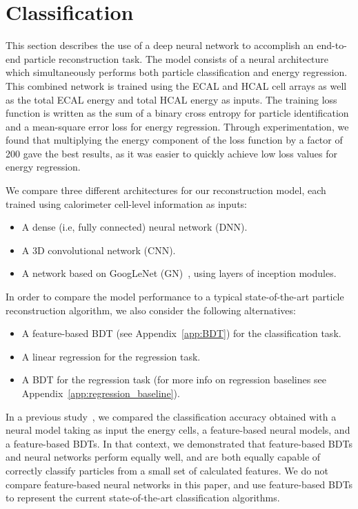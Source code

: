 \chapter{Classification}

This section describes the use of a deep neural network to accomplish an end-to-end particle reconstruction task. The model consists of a neural architecture which simultaneously performs both particle classification and energy regression. This combined network is trained using the ECAL and HCAL cell arrays as well as the total ECAL energy and total HCAL energy as inputs. The training loss function is written as the sum of a binary cross entropy for particle identification and a mean-square error loss for energy regression. Through experimentation, we found that multiplying the energy component of the loss function by a factor of 200 gave the best results, as it was easier to quickly achieve low loss values for energy regression.

We compare three different architectures for our reconstruction model, each trained using calorimeter cell-level information as inputs:
\begin{itemize}
\item A dense (i.e, fully connected) neural network (DNN).
\item A 3D convolutional network (CNN).
\item A network based on GoogLeNet (GN)~\cite{GoogLeNet}, using layers of inception modules.
\end{itemize}

In order to compare the model performance to a typical state-of-the-art particle reconstruction algorithm, we also consider the following alternatives:
\begin{itemize}
    \item A feature-based BDT (see Appendix~\ref{app:BDT}) for the classification task.
    \item A linear regression for the regression task.
    \item A BDT for the regression task (for more info on regression baselines see Appendix~\ref{app:regression_baseline}).
\end{itemize}

In a previous study~\cite{NIPS}, we compared the classification accuracy obtained with a neural model taking as input the energy cells, a feature-based neural models, and a feature-based BDTs. In that context, we demonstrated that feature-based BDTs and neural networks perform equally well, and are both equally capable of correctly classify particles from a small set of calculated features. 
We do not compare feature-based neural networks in this paper, and use feature-based BDTs to represent the current state-of-the-art classification algorithms.

